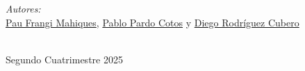 \documentclass[a4paper,11pt,final]{article}
\begin{document}
\begin{titlepage}
    
    \vspace{0.5cm}
    \begin{minipage}{0.7\textwidth}
    \begin{flushleft} \large
    \emph{Autores:}\\
    \href{https://github.com/Pau-Frangi}{Pau Frangi Mahiques}, \href{https://github.com/PabloPC05}{Pablo Pardo Cotos} y \href{https://github.com/DIEGOROCU}{Diego Rodríguez Cubero}\\
    \end{flushleft}
    
    \end{minipage}\\[2cm]
    

    
    Segundo Cuatrimestre 2025
    \vfill %

\end{titlepage}

\newpage
\pagestyle{plain}    
\tableofcontents
\newpage


\end{document}
